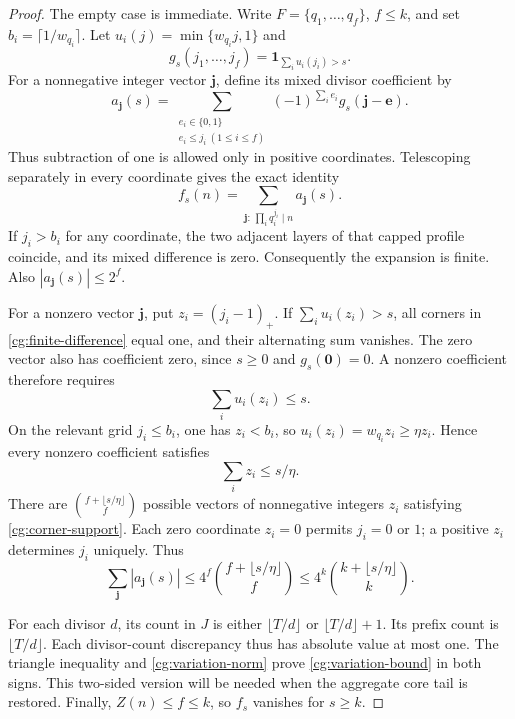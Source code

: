 \begin{proof}
The empty case is immediate. Write $F=\{q_1,\ldots,q_f\}$,
$f\le k$, and set $b_i=\lceil1/w_{q_i}\rceil$.
Let $u_i(j)=\min\{w_{q_i}j,1\}$ and
\[
 g_s(j_1,\ldots,j_f)=\mathbf1_{\sum_i u_i(j_i)>s}.
\]
For a nonnegative integer vector $\mathbf j$, define its mixed
divisor coefficient by
\begin{equation}
 a_{\mathbf j}(s)=
 \sum_{\substack{e_i\in\{0,1\}\\ e_i\le j_i\ (1\le i\le f)}}
 (-1)^{\sum_i e_i}g_s(\mathbf j-\mathbf e).
 \label{cg:finite-difference}
\end{equation}
Thus subtraction of one is allowed only in positive coordinates.
Telescoping separately in every coordinate gives the exact identity
\begin{equation}
 f_s(n)=\sum_{\mathbf j:\,\prod_iq_i^{j_i}\mid n}a_{\mathbf j}(s).
 \label{cg:divisor-expansion}
\end{equation}
If $j_i>b_i$ for any coordinate, the two adjacent layers of that
capped profile coincide, and its mixed difference is zero.
Consequently the expansion is finite. Also
$|a_{\mathbf j}(s)|\le2^f$.

For a nonzero vector $\mathbf j$, put $z_i=(j_i-1)_+$.
If $\sum_i u_i(z_i)>s$, all corners in
\eqref{cg:finite-difference} equal one, and their alternating sum
vanishes. The zero vector also has coefficient zero, since $s\ge0$
and $g_s(\mathbf0)=0$. A nonzero coefficient therefore requires
\[
 \sum_i u_i(z_i)\le s.
\]
On the relevant grid $j_i\le b_i$, one has $z_i<b_i$, so
$u_i(z_i)=w_{q_i}z_i\ge\eta z_i$. Hence every nonzero
coefficient satisfies
\begin{equation}
 \sum_i z_i\le s/\eta.
 \label{cg:corner-support}
\end{equation}
There are $\binom{f+\lfloor s/\eta\rfloor}{f}$ possible vectors
of nonnegative integers $z_i$ satisfying \eqref{cg:corner-support}.
Each zero coordinate $z_i=0$ permits $j_i=0$ or $1$; a positive
$z_i$ determines $j_i$ uniquely. Thus
\begin{equation}
 \sum_{\mathbf j}|a_{\mathbf j}(s)|
 \le4^f\binom{f+\lfloor s/\eta\rfloor}{f}
 \le4^k\binom{k+\lfloor s/\eta\rfloor}{k}.
 \label{cg:variation-norm}
\end{equation}

For each divisor $d$, its count in $J$ is either
$\lfloor T/d\rfloor$ or $\lfloor T/d\rfloor+1$.
Its prefix count is $\lfloor T/d\rfloor$. Each divisor-count
discrepancy thus has absolute value at most one. The triangle
inequality and \eqref{cg:variation-norm} prove
\eqref{cg:variation-bound} in both signs. This two-sided version
will be needed when the aggregate core tail is restored.
Finally, $Z(n)\le f\le k$, so $f_s$ vanishes for $s\ge k$.
\end{proof}

